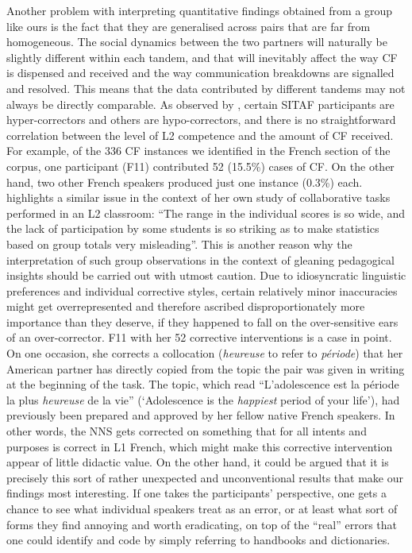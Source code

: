 \documentclass[output=paper,colorlinks,citecolor=brown,modfonts,nonflat]{../langscibook}
\begin{document}
Another problem with interpreting quantitative findings obtained from a group like ours is the fact that they are generalised across pairs that are far from homogeneous. The social dynamics between the two partners will naturally be slightly different within each tandem, and that will inevitably affect the way CF is dispensed and received and the way communication breakdowns are signalled and resolved. This means that the data contributed by different tandems may not always be directly comparable. As observed by \citet{HorguesTardieu2015}, certain SITAF participants are hyper-correctors and others are hypo-correctors, and there is no straightforward correlation between the level of L2 competence and the amount of CF received. For example, of the 336 CF instances we identified in the French section of the corpus, one participant (F11) contributed 52 (15.5\%) cases of CF. On the other hand, two other French speakers produced just one instance (0.3\%) each. \citet[25]{Foster1993} highlights a similar issue in the context of her own study of collaborative tasks performed in an L2 classroom: “The range in the individual scores is so wide, and the lack of participation by some students is so striking as to make statistics based on group totals very misleading”. This is another reason why the interpretation of such group observations in the context of gleaning pedagogical insights should be carried out with utmost caution. Due to idiosyncratic linguistic preferences and individual corrective styles, certain relatively minor inaccuracies might get overrepresented and therefore ascribed disproportionately more importance than they deserve, if they happened to fall on the over-sensitive ears of an over-corrector. F11 with her 52 corrective interventions is a case in point. On one occasion, she corrects a collocation (\textit{heureuse} to refer to \textit{période}) that her American partner has directly copied from the topic the pair was given in writing at the beginning of the task. The topic, which read “L’adolescence est la période la plus \textit{heureuse} de la vie” (‘Adolescence is the \textit{happiest} period of your life’), had previously been prepared and approved by her fellow native French speakers. In other words, the NNS gets corrected on something that for all intents and purposes is correct in L1 French, which might make this corrective intervention appear of little didactic value. On the other hand, it could be argued that it is precisely this sort of rather unexpected and unconventional results that make our findings most interesting. If one takes the participants’ perspective, one gets a chance to see what individual speakers treat as an error, or at least what sort of forms they find annoying and worth eradicating, on top of the “real” errors that one could identify and code by simply referring to handbooks and dictionaries.
\end{document}
